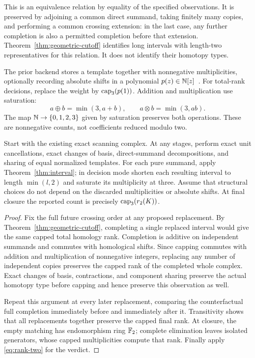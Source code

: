 This is an equivalence relation by equality of the specified observations.
It is preserved by adjoining a common direct summand, taking finitely
many copies, and performing a common crossing extension: in the last
case, any further completion is also a permitted completion before that
extension. Theorem~\ref{thm:geometric-cutoff} identifies long intervals
with length-two representatives for this relation. It does not identify
their homotopy types.

The prior backend stores a template together with nonnegative
multiplicities, optionally recording absolute shifts in a polynomial
$p(z)\in\mathbb N[z]$~\cite{prior}. For total-rank decisions, replace the
weight by $\operatorname{cap}_3(p(1))$. Addition and multiplication use saturation:
\[
 a\oplus b=\min(3,a+b),\qquad a\otimes b=\min(3,ab).
\]
The map $\mathbb N\to\{0,1,2,3\}$ given by saturation preserves both
operations. These are nonnegative counts, not coefficients reduced
modulo two.

\begin{theorem}
\label{thm:decision-correctness}
Start with the existing exact scanning complex. At any stages, perform
exact unit cancellations, exact changes of basis, direct-summand
decompositions, and sharing of equal normalized templates. For each
pure summand, apply Theorem~\ref{thm:interval}; in decision mode shorten
each resulting interval to length $\min(l,2)$ and saturate its
multiplicity at three. Assume that structural choices do not depend on
the discarded multiplicities or absolute shifts. At final closure the
reported count is precisely $\operatorname{cap}_3(r_2(K))$.
\end{theorem}

\begin{proof}
Fix the full future crossing order at any proposed replacement. By
Theorem~\ref{thm:geometric-cutoff}, completing a single replaced interval
would give the same capped total homology rank. Completion is additive
on independent summands and commutes with homological shifts. Since
capping commutes with addition and multiplication of nonnegative
integers, replacing any number of independent copies preserves the
capped rank of the completed whole complex. Exact changes of basis,
contractions, and component sharing preserve the actual homotopy type
before capping and hence preserve this observation as well.

Repeat this argument at every later replacement, comparing the
counterfactual full completion immediately before and immediately after
it. Transitivity shows that all replacements together preserve the
capped final rank. At closure, the empty matching has endomorphism
ring $\mathbb F_2$; complete elimination leaves isolated generators, whose
capped multiplicities compute that rank. Finally apply
\eqref{eq:rank-two} for the verdict.
\end{proof}

